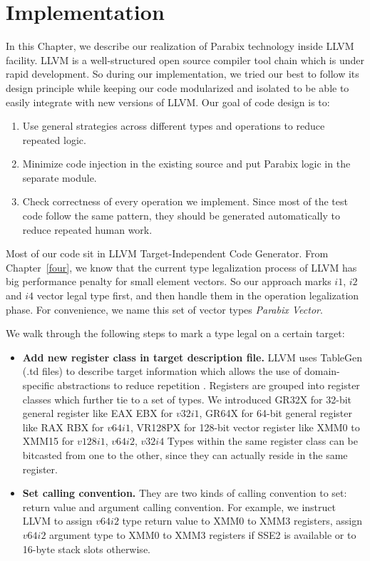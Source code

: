 %
%

\chapter{Implementation}
\label{five}

In this Chapter, we describe our realization of Parabix technology inside LLVM facility. LLVM is a well-structured open source compiler tool chain which is under rapid development. So during our implementation, we tried our best to follow its design principle while keeping our code modularized and isolated to be able to easily integrate with new versions of LLVM\@. Our goal of code design is to:
\begin{enumerate}
  \item Use general strategies across different types and operations to reduce repeated logic.
  \item Minimize code injection in the existing source and put Parabix logic in the separate module.
  \item Check correctness of every operation we implement. Since most of the test code follow the same pattern, they should be generated automatically to reduce repeated human work.
\end{enumerate}

Most of our code sit in LLVM Target-Independent Code Generator\cite{llvm_code_gen}. From Chapter~\ref{four}, we know that the current type legalization process of LLVM has big performance penalty for small element vectors. So our approach marks $i1$, $i2$ and $i4$ vector legal type first, and then handle them in the operation legalization phase. For convenience, we name this set of vector types \textit{Parabix Vector}.

We walk through the following steps to mark a type legal on a certain target:
\begin{itemize}
  \item \textbf{Add new register class in target description file.} LLVM uses TableGen (.td files) to describe target information which allows the use of domain-specific abstractions to reduce repetition \cite{llvm_code_gen}. Registers are grouped into register classes which further tie to a set of types. We introduced GR32X for 32-bit general register like EAX EBX for $v32i1$, GR64X for 64-bit general register like RAX RBX for $v64i1$, VR128PX for 128-bit vector register like XMM0 to XMM15 for $v128i1$, $v64i2$, $v32i4$  Types within the same register class can be bitcasted from one to the other, since they can actually reside in the same register.

  \item \textbf{Set calling convention.} They are two kinds of calling convention to set: return value and argument calling convention. For example, we instruct LLVM to assign $v64i2$ type return value to XMM0 to XMM3 registers, assign $v64i2$ argument type to XMM0 to XMM3 registers if SSE2 is available or to 16-byte stack slots otherwise.
\end{itemize}

